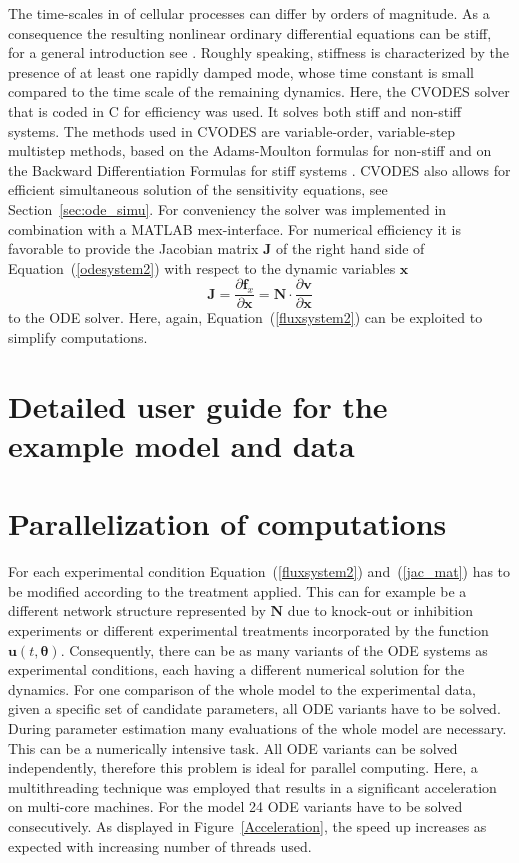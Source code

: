 \documentclass[12pt,a4paper]{scrartcl}
\newcommand{\dd}[2]{\frac{\partial #1}{\partial #2}}
\begin{document}
The time-scales in of cellular processes can differ by orders of magnitude. As a consequence the resulting nonlinear ordinary differential equations can be stiff, for a general introduction see \citet{Lambert:1977fk}. Roughly speaking, stiffness is characterized by the presence of at least one rapidly damped mode, whose time constant is small compared to the time scale of the remaining dynamics. Here, the CVODES solver \citep{Hindmarsh:2005fb} that is coded in C for efficiency was used. It solves both stiff and non-stiff systems. The methods used in CVODES are variable-order, variable-step multistep methods, based on the Adams-Moulton formulas for non-stiff and on the Backward Differentiation Formulas for stiff systems \citep{Byrne:1975uq}. CVODES also allows for efficient simultaneous solution of the sensitivity equations, see Section~\ref{sec:ode_simu}. For conveniency the solver was implemented in combination with a MATLAB mex-interface. For numerical efficiency it is favorable to provide the Jacobian matrix $\mathbf{J}$ of the right hand side of Equation~(\ref{odesystem2}) with respect to the dynamic variables $\mathbf{x}$ 
\begin{equation}
	\mathbf{J} = \dd{\mathbf{f}_{x}}{\mathbf{x}} = \mathbf{N} \cdot \dd{\mathbf{v}}{\mathbf{x}}\label{jac_mat}
\end{equation}
to the ODE solver. Here, again, Equation~(\ref{fluxsystem2}) can be exploited to simplify computations.

\section{Detailed user guide for the \citet{Raia:2011vn} example model and data} \label{user_guide}

\section{Parallelization of computations} \label{sec:parallel}
For each experimental condition Equation~(\ref{fluxsystem2}) and~(\ref{jac_mat}) has to be modified according to the treatment applied. This can for example be a different network structure represented by $\mathbf{N}$ due to knock-out or inhibition experiments or different experimental treatments incorporated by the function $\mathbf{u}(t, \boldsymbol{\theta})$. Consequently, there can be as many variants of the ODE systems as experimental conditions, each having a different numerical solution for the dynamics. For one comparison of the whole model to the experimental data, given a specific set of candidate parameters, all ODE variants have to be solved. During parameter estimation many evaluations of the whole model are necessary. This can be a numerically intensive task. All ODE variants can be solved independently, therefore this problem is ideal for parallel computing. Here, a multithreading technique was employed that results in a significant acceleration on multi-core machines. For the \citet{Bachmann:2011fk} model 24 ODE variants have to be solved consecutively. As displayed in Figure~\ref{Acceleration}, the speed up increases as expected with increasing number of threads used.
\end{document}
